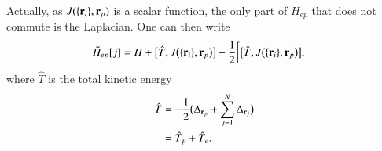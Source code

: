 \documentclass[aip,jcp,reprint,noshowkeys,superscriptaddress]{revtex4-1}
\newcommand{\bri}[1]{{\bf r}_{#1}}
\newcommand{\Hep}[0]{H_{ep}}
\newcommand{\Hept}[0]{\tilde{H}_{ep}}
\begin{document}
Actually, as $J(\{\bri{i} \},\bri{p})$ is a scalar function, the only part of $\Hep$ that does not commute is the Laplacian. 
One can then write 
\begin{equation}
 \begin{aligned}
 \Hept[j] &= H + \big[\hat{T},J\big(\{\bri{i} \},\bri{p}\big)\big] + \frac{1}{2} \bigg[\big[\hat{T},J\big(\{\bri{i} \},\bri{p}\big)\big],
 \end{aligned}
\end{equation}
where $\hat{T}$ is the total kinetic energy
\begin{equation}
 \begin{aligned}
 \hat{T}  & =  -\frac{1}{2} \big( \Delta_{\bri{p}} + \sum_{j=1}^{N} \Delta_{\bri{j}} \big)  \\
          & = \hat{T}_p + \hat{T}_e. 
 \end{aligned}
\end{equation}
\end{document}
